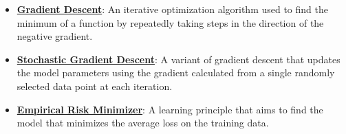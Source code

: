 \documentclass{article}%
\begin{document}
\begin{itemize}[leftmargin=*]
\item \href{https://purdue.brightspace.com/d2l/common/assets/pdfjs-d2l-dist/1.0.14-legacy/web/viewer.html?file=\%2Fcontent\%2Fenforced\%2F1095467-wl.202510.CS.24300.001\%2F05L2-ML Basics.pdf\%3Fou\%3D1095467\&lang=en-us\&container=d2l-fileviewer-rendered-pdf\&fullscreen=d2l-fileviewer-rendered-pdf-dialog\&height=667#page=28}{\textbf{Gradient Descent}}: An iterative optimization algorithm used to find the minimum of a function by repeatedly taking steps in the direction of the negative gradient.%
\item \href{https://purdue.brightspace.com/d2l/common/assets/pdfjs-d2l-dist/1.0.14-legacy/web/viewer.html?file=\%2Fcontent\%2Fenforced\%2F1095467-wl.202510.CS.24300.001\%2F05L2-ML Basics.pdf\%3Fou\%3D1095467\&lang=en-us\&container=d2l-fileviewer-rendered-pdf\&fullscreen=d2l-fileviewer-rendered-pdf-dialog\&height=667#page=29}{\textbf{Stochastic Gradient Descent}}: A variant of gradient descent that updates the model parameters using the gradient calculated from a single randomly selected data point at each iteration.%
\item \href{https://purdue.brightspace.com/d2l/common/assets/pdfjs-d2l-dist/1.0.14-legacy/web/viewer.html?file=\%2Fcontent\%2Fenforced\%2F1095467-wl.202510.CS.24300.001\%2F05L2-ML Basics.pdf\%3Fou\%3D1095467\&lang=en-us\&container=d2l-fileviewer-rendered-pdf\&fullscreen=d2l-fileviewer-rendered-pdf-dialog\&height=667#page=15}{\textbf{Empirical Risk Minimizer}}: A learning principle that aims to find the model that minimizes the average loss on the training data.%
\end{itemize}

%
\end{document}
